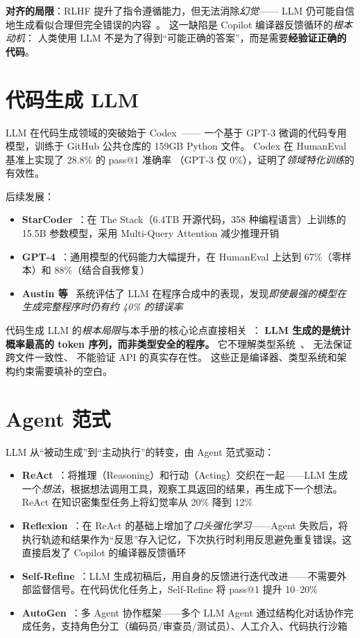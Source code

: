 \documentclass[10pt, openany]{book}
\begin{document}
\noindent \textbf{对齐的局限}：RLHF 提升了指令遵循能力，但无法消除\emph{幻觉}——
LLM 仍可能自信地生成看似合理但完全错误的内容~\cite{Kadavath2022SelfEvaluation}。
这一缺陷是 Copilot 编译器反馈循环的\emph{根本动机}：
人类使用 LLM 不是为了得到``可能正确的答案''，而是需要\textbf{经验证正确的代码}。

\section{代码生成 LLM}

LLM 在代码生成领域的突破始于 Codex~\cite{Chen2021Codex}——
一个基于 GPT-3 微调的代码专用模型，训练于 GitHub 公共仓库的 159GB Python 文件。
Codex 在 HumanEval 基准上实现了 28.8\% 的 pass@1 准确率
（GPT-3 仅 0\%），证明了\emph{领域特化训练}的有效性。

\noindent 后续发展：
\begin{itemize}
    \item \textbf{StarCoder}~\cite{Li2022StarCoder}：在 The Stack（6.4TB 开源代码，358 种编程语言）上训练的 15.5B 参数模型，采用 Multi-Query Attention 减少推理开销
    \item \textbf{GPT-4}~\cite{OpenAI2023GPT4}：通用模型的代码能力大幅提升，在 HumanEval 上达到 67\%（零样本）和 88\%（结合自我修复）
    \item \textbf{Austin 等}~\cite{Austin2021Program} 系统评估了 LLM 在程序合成中的表现，发现\emph{即使最强的模型在生成完整程序时仍有约 40\% 的错误率}
\end{itemize}

代码生成 LLM 的\emph{根本局限}与本手册的核心论点直接相关~\cite{Chen2021Codex}：
\textbf{LLM 生成的是统计概率最高的 token 序列，而非类型安全的程序。}
它不理解类型系统~\cite{Pierce2002TAPL}、
无法保证跨文件一致性、
不能验证 API 的真实存在性。
这些正是编译器、类型系统和架构约束需要填补的空白。

\section{Agent 范式}

LLM 从``被动生成''到``主动执行''的转变，由 Agent 范式驱动：

\begin{itemize}
    \item \textbf{ReAct}~\cite{Yao2023ReAct}：将推理（Reasoning）和行动（Acting）交织在一起——LLM 生成一个\emph{想法}，根据想法调用工具，观察工具返回的结果，再生成下一个想法。ReAct 在知识密集型任务上将幻觉率从 20\% 降到 12\%~\cite{Yao2023ReAct}
    \item \textbf{Reflexion}~\cite{Shinn2024Reflexion}：在 ReAct 的基础上增加了\emph{口头强化学习}——Agent 失败后，将执行轨迹和结果作为``反思''存入记忆，下次执行时利用反思避免重复错误。这直接启发了 Copilot 的编译器反馈循环
    \item \textbf{Self-Refine}~\cite{Wang2023SelfRefine}：LLM 生成初稿后，用自身的反馈进行迭代改进——不需要外部监督信号。在代码优化任务上，Self-Refine 将 pass@1 提升 10--20\%
    \item \textbf{AutoGen}~\cite{Wu2024AutoGen}：多 Agent 协作框架——多个 LLM Agent 通过结构化对话协作完成任务，支持角色分工（编码员/审查员/测试员）、人工介入、代码执行沙箱
\end{itemize}
\end{document}
